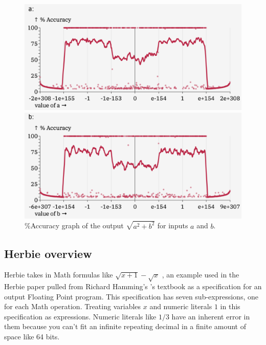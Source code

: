 \documentclass{article}
\begin{document}
\begin{figure}[ht]
\centering
\begin{minipage}{0.45\textwidth}
  \includegraphics[width=\textwidth]{hypot-error-a.png}
\end{minipage}
\hfill
\begin{minipage}{0.45\textwidth}
  \includegraphics[width=\textwidth]{hypot-error-b.png}
\end{minipage}
\caption{\%Accuracy graph of the output $\sqrt{a^2 + b^2}$ for inputs $a$ and $b$.}
\label{fig:hypot-error-graph}
\end{figure}

\subsection{Herbie overview}


Herbie takes in Math formulas like $\sqrt{x + 1} - \sqrt{x}$ , an example used in the Herbie paper pulled from Richard Hamming's \cite{Hamming}'s textbook as a specification for an output Floating Point program. This specification has seven sub-expressions, one for each Math operation. Treating variables $x$ and numeric literals $1$  in this specification as expressions. Numeric literals like $1/3$ have an inherent error in them because you can't fit an infinite repeating decimal in a finite amount of space like 64 bits. 
\end{document}
